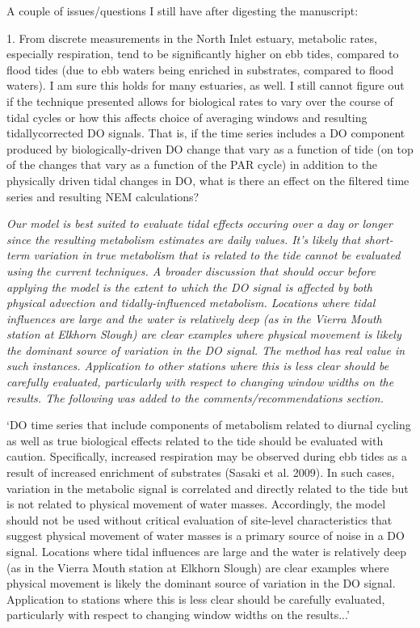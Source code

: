 \documentclass[letterpaper,12pt]{article}\usepackage[]{graphicx}\usepackage[]{color}
\begin{document}
A couple of issues/questions I still have after digesting the manuscript:

1. From discrete measurements in the North Inlet estuary, metabolic rates, especially respiration, tend to be significantly higher on ebb tides, compared to flood tides (due to ebb waters being enriched in substrates, compared to flood waters). I am sure this holds for many estuaries, as well. I still cannot figure out if the technique presented allows for biological rates to vary over the course of tidal cycles or how this affects choice of averaging windows and resulting tidallycorrected DO signals. That is, if the time series includes a DO component produced by biologically-driven DO change that vary as a function of tide (on top of the changes that vary as a function of the PAR cycle) in addition to the physically driven tidal changes in DO, what is there an effect on the filtered time series and resulting NEM calculations?

{\it Our model is best suited to evaluate tidal effects occuring over a day or longer since the resulting metabolism estimates are daily values. It's likely that short-term variation in true metabolism that is related to the tide cannot be evaluated using the current techniques.  A broader discussion that should occur before applying the model is the extent to which the DO signal is affected by both physical advection and tidally-influenced metabolism.  Locations where tidal influences are large and the water is relatively deep (as in the Vierra Mouth station at Elkhorn Slough) are clear examples where physical movement is likely the dominant source of variation in the DO signal.  The method has real value in such instances.  Application to other stations where this is less clear should be carefully evaluated, particularly with respect to changing window widths on the results.  The following was added to the comments/recommendations section.

`DO time series that include components of metabolism related to diurnal cycling as well as true biological effects related to the tide should be evaluated with caution.  Specifically, increased respiration may be observed during ebb tides as a result of increased enrichment of substrates (Sasaki et al. 2009).  In such cases, variation in the metabolic signal is correlated and directly related to the tide but is not related to physical movement of water masses. Accordingly, the model should not be used without critical evaluation of site-level characteristics that suggest physical movement of water masses is a primary source of noise in a DO signal.  Locations where tidal influences are large and the water is relatively deep (as in the Vierra Mouth station at Elkhorn Slough) are clear examples where physical movement is likely the dominant source of variation in the DO signal.  Application to stations where this is less clear should be carefully evaluated, particularly with respect to changing window widths on the results...' 

}
\end{document}
